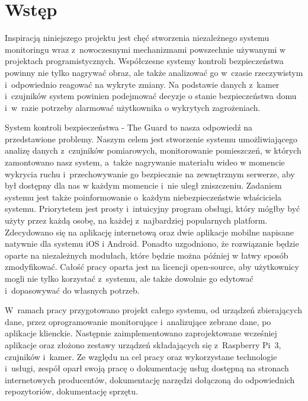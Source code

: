 \chapter{Wstęp}
Inspiracją niniejszego projektu jest chęć stworzenia niezależnego systemu monitoringu wraz z~nowoczesnymi mechanizmami powszechnie używanymi w projektach programistycznych.
Współczesne systemy kontroli bezpieczeństwa powinny nie tylko nagrywać obraz, ale także analizować go w~czasie rzeczywistym i~odpowiednio reagować na wykryte zmiany. Na podstawie danych z~kamer i~czujników system powinien podejmować decyzje o stanie bezpieczeństwa domu i~w~razie potrzeby alarmować użytkownika o wykrytych zagrożeniach.

System kontroli bezpieczeństwa - The Guard to nasza odpowiedź na przedstawione problemy. Naszym celem jest stworzenie systemu umożliwiającego analizę danych z~czujników pomiarowych, monitorowanie pomieszczeń, w których zamontowano nasz system, a~także nagrywanie materiału wideo w momencie wykrycia ruchu i~przechowywanie go bezpiecznie na zewnętrznym serwerze, aby był dostępny dla nas w każdym momencie i~nie uległ zniszczeniu. Zadaniem systemu jest także poinformowanie o~każdym niebezpieczeństwie właściciela systemu. Priorytetem jest prosty i~intuicyjny program obsługi, który mógłby być użyty przez każdą osobę, na każdej z~najbardziej popularnych platform. Zdecydowano się na aplikację internetową oraz dwie aplikacje mobilne napisane natywnie dla systemu iOS i Android. Ponadto uzgodniono, że rozwiązanie będzie oparte na niezależnych modułach, które będzie można później w łatwy sposób zmodyfikować. Całość pracy oparta jest na licencji open-source, aby użytkownicy mogli nie tylko korzystać z~systemu, ale także dowolnie go edytować i~dopasowywać do własnych potrzeb.

W~ramach pracy przygotowano projekt całego systemu, od urządzeń zbierających dane, przez oprogramowanie monitorujące i~analizujące zebrane dane, po aplikacje klienckie. Następnie zaimplementowano zaprojektowane wcześniej aplikacje oraz złożono zestawy urządzeń składających się z~Raspberry Pi~3, czujników i~kamer.
Ze względu na cel pracy oraz wykorzystane technologie i~usługi, zespół oparł swoją pracę o dokumentację usług dostępną na stronach internetowych producentów, dokumentację narzędzi dołączoną do odpowiednich repozytoriów, dokumentację sprzętu.

